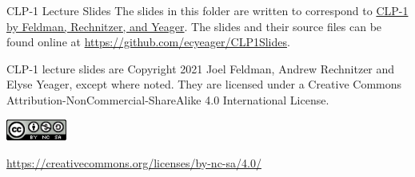\documentclass[10pt]{beamer}
\begin{document}

\begin{frame}{CLP-1 Lecture Slides}
The slides in this folder are written to correspond to \href{https://secure.math.ubc.ca/~CLP/CLP1/}{CLP-1 by Feldman, Rechnitzer, and Yeager}. The slides and their source files can be found online at \url{https://github.com/ecyeager/CLP1Slides}.
\vfill

CLP-1 lecture slides are Copyright 2021 Joel Feldman, Andrew Rechnitzer and Elyse Yeager, except where noted.
They are licensed under a Creative Commons Attribution-NonCommercial-ShareAlike 4.0 International License.
\begin{center}
\includegraphics[height=7mm]{Clipart/CC}
\end{center}
\url{https://creativecommons.org/licenses/by-nc-sa/4.0/}
 \end{frame}

\end{document}

